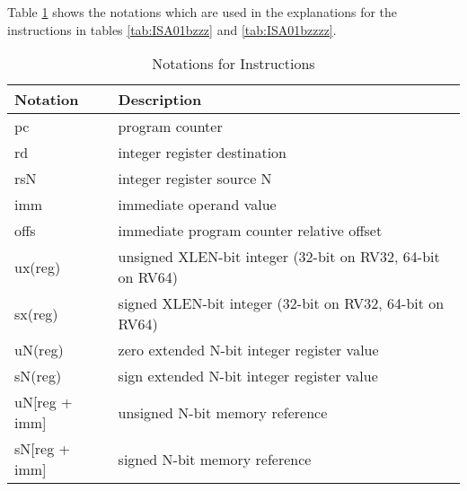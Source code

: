 
Table \ref{tab:ISA01w} shows the notations which are used in the explanations for the instructions in tables \ref{tab:ISA01bzzz} and \ref{tab:ISA01bzzzz}.
\begin{table}[H]
\caption{Notations for Instructions}
\centering
\begin{tabular}{| l | p{8cm} |}
  \hline
  Notation & Description \\
  \hline
  \hline
  pc & program counter \\
  \hline
  rd  & integer register destination \\
  \hline
  rsN  & integer register source N \\
  \hline
  imm  & immediate operand value \\
  \hline
  offs  & immediate program counter relative offset \\
  \hline
  ux(reg)  & unsigned XLEN-bit integer (32-bit on RV32, 64-bit on RV64) \\
  \hline
  sx(reg)  & signed XLEN-bit integer (32-bit on RV32, 64-bit on RV64) \\
  \hline
  uN(reg)  & zero extended N-bit integer register value \\
  \hline
  sN(reg)  & sign extended N-bit integer register value \\
  \hline
  uN[reg + imm]  & unsigned N-bit memory reference \\
  \hline
  sN[reg + imm]  & signed N-bit memory reference \\
  \hline
\end{tabular}
\label{tab:ISA01w}
\end{table}
